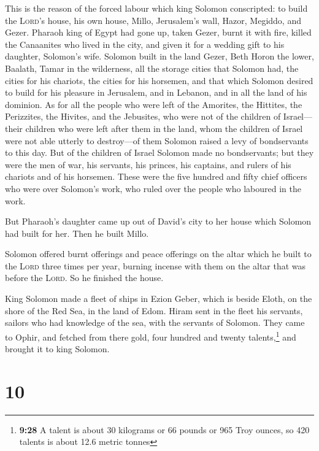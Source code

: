  This is the reason of the forced labour which king
Solomon conscripted: to build the \textsc{Lord}'s house, his own house,
Millo, Jerusalem's wall, Hazor, Megiddo, and Gezer. 
Pharaoh king of Egypt had gone up, taken Gezer, burnt it with fire,
killed the Canaanites who lived in the city, and given it for a wedding
gift to his daughter, Solomon's wife.  Solomon built in
the land Gezer, Beth Horon the lower,  Baalath, Tamar in
the wilderness,  all the storage cities that Solomon had,
the cities for his chariots, the cities for his horsemen, and that which
Solomon desired to build for his pleasure in Jerusalem, and in Lebanon,
and in all the land of his dominion.  As for all the
people who were left of the Amorites, the Hittites, the Perizzites, the
Hivites, and the Jebusites, who were not of the children of Israel---
 their children who were left after them in the land,
whom the children of Israel were not able utterly to destroy---of them
Solomon raised a levy of bondservants to this day.  But
of the children of Israel Solomon made no bondservants; but they were
the men of war, his servants, his princes, his captains, and rulers of
his chariots and of his horsemen.  These were the five
hundred and fifty chief officers who were over Solomon's work, who ruled
over the people who laboured in the work.

 But Pharaoh's daughter came up out of David's city to
her house which Solomon had built for her. Then he built Millo.

 Solomon offered burnt offerings and peace offerings on
the altar which he built to the \textsc{Lord} three times per year,
burning incense with them on the altar that was before the
\textsc{Lord}. So he finished the house.

 King Solomon made a fleet of ships in Ezion Geber, which
is beside Eloth, on the shore of the Red Sea, in the land of Edom.
 Hiram sent in the fleet his servants, sailors who had
knowledge of the sea, with the servants of Solomon.  They
came to Ophir, and fetched from there gold, four hundred and twenty
talents,\footnote{\textbf{9:28} A talent is about 30 kilograms or 66
  pounds or 965 Troy ounces, so 420 talents is about 12.6 metric tonnes}
and brought it to king Solomon.

\hypertarget{section-9}{%
\section{10}\label{section-9}}

